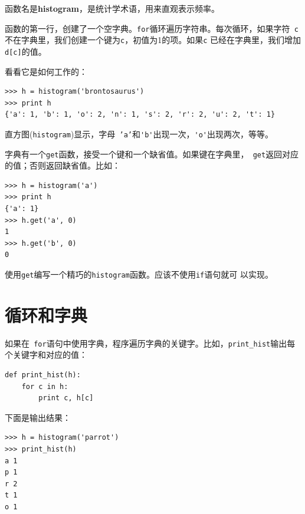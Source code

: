 函数名是{\bf histogram}，是统计学术语，用来直观表示频率。


函数的第一行，创建了一个空字典。{\tt for}循环遍历字符串。每次循环，如果字符{\tt
	c}
	不在字典里，我们创建一个键为{\tt c}，初值为1的项。如果{\tt c}
	已经在字典里，我们增加{\tt d[c]}的值。


看看它是如何工作的：

\beforeverb
\begin{verbatim}
>>> h = histogram('brontosaurus')
>>> print h
{'a': 1, 'b': 1, 'o': 2, 'n': 1, 's': 2, 'r': 2, 'u': 2, 't': 1}
\end{verbatim}
\afterverb

直方图({\tt histogram})显示，字母{\tt
	'a'}和\verb"'b'"出现一次，\verb"'o'"出现两次，等等。


\begin{ex}


字典有一个{\tt get}函数，接受一个键和一个缺省值。如果键在字典里，{\tt
	get}返回对应的值；否则返回缺省值。比如：

\beforeverb
\begin{verbatim}
>>> h = histogram('a')
>>> print h
{'a': 1}
>>> h.get('a', 0)
1
>>> h.get('b', 0)
0
\end{verbatim}
\afterverb

使用{\tt get}编写一个精巧的{\tt histogram}函数。应该不使用{\tt if}语句就可
以实现。
\end{ex}


\section{循环和字典}


如果在{\tt
	for}语句中使用字典，程序遍历字典的关键字。比如，\verb"print_hist"输出每个关键字和对应的值：


\beforeverb
\begin{verbatim}
def print_hist(h):
    for c in h:
        print c, h[c]
\end{verbatim}
\afterverb

下面是输出结果：

\beforeverb
\begin{verbatim}
>>> h = histogram('parrot')
>>> print_hist(h)
a 1
p 1
r 2
t 1
o 1
\end{verbatim}
\afterverb

